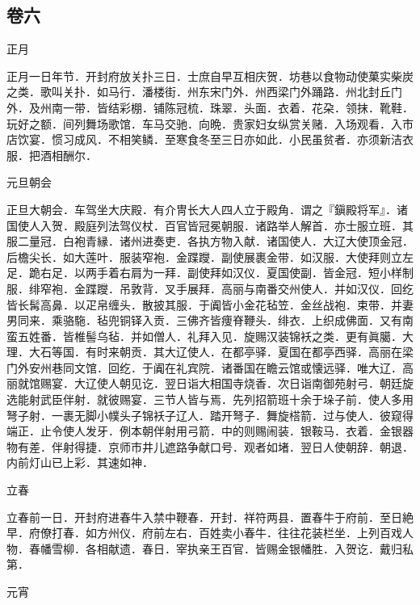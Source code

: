 \documentclass[]{article}
\begin{document}
\hypertarget{header-n111}{%
\subsection{卷六}\label{header-n111}}

正月

正月一日年节．开封府放关扑三日．士庶自早互相庆贺．坊巷以食物动使菓实柴炭之类．歌叫关扑．如马行．潘楼街．州东宋门外．州西梁门外踊路．州北封丘门外．及州南一带．皆结彩棚．铺陈冠梳．珠翠．头面．衣着．花朶．领抹．靴鞋．玩好之额．间列舞场歌馆．车马交驰．向晩．贵家妇女纵赏关赌．入场观看．入市店饮宴．惯习成风．不相笑鳞．至寒食冬至三日亦如此．小民虽贫者．亦须新洁衣服．把酒相酬尔．

元旦朝会

正旦大朝会．车驾坐大庆殿．有介冑长大人四人立于殿角．谓之『鎭殿将军』．诸国使人入贺．殿庭列法驾仪杖．百官皆冠冕朝服．诸路举人解首．亦士服立班．其服二量冠．白袍青縁．诸州进奏吏．各执方物入献．诸国使人．大辽大使顶金冠．后檐尖长．如大莲叶．服装窄袍．金蹀躞．副使展裹金带．如汉服．大使拜则立左足．跪右足．以两手着右肩为一拜．副使拜如汉仪．夏国使副．皆金冠．短小样制服．绯窄袍．金蹀躞．吊敦背．叉手展拜．高丽与南番交州使人．并如汉仪．回纥皆长髯高鼻．以疋帛缠头．散披其服．于阗皆小金花毡笠．金丝战袍．束带．并妻男同来．乘骆駞．毡兜铜铎入贡．三佛齐皆痩脊鞭头．绯衣．上织成佛面．又有南蛮五姓番．皆椎髻乌毡．并如僧人．礼拜入见．旋赐汉装锦袄之类．更有眞臈．大理．大石等国．有时来朝贡．其大辽使人．在都亭驿．夏国在都亭西驿．高丽在梁门外安州巷同文馆．回纥．于阗在礼宾院．诸番国在瞻云馆或懐远驿．唯大辽．高丽就馆赐宴．大辽使人朝见讫．翌日诣大相国寺烧香．次日诣南御苑射弓．朝廷旋选能射武臣伴射．就彼赐宴．三节人皆与焉．先列招箭班十余于垛子前．使人多用弩子射．一裹无脚小幞头子锦袄子辽人．踏开弩子．舞旋榙箭．过与使人．彼窥得端正．止令使人发牙．例本朝伴射用弓箭．中的则赐闹装．银鞍马．衣着．金银器物有差．伴射得捷．京师市井儿遮路争献口号．观者如堵．翌日人使朝辞．朝退．内前灯山已上彩．其速如神．

立春

立春前一日．开封府进春牛入禁中鞭春．开封．祥符两县．置春牛于府前．至日絶早．府僚打春．如方州仪．府前左右．百姓卖小春牛．往往花装栏坐．上列百戏人物．春幡雪柳．各相献遗．春日．宰执亲王百官．皆赐金银幡胜．入贺讫．戴归私第．

元宵
\end{document}
